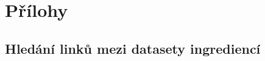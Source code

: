 \documentclass[12pt,a4paper]{report}
\begin{document}



\tableofcontents











\listoffigures


\appendix
\chapter{Přílohy}

\section{Hledání linků mezi datasety ingrediencí}
\end{document}
